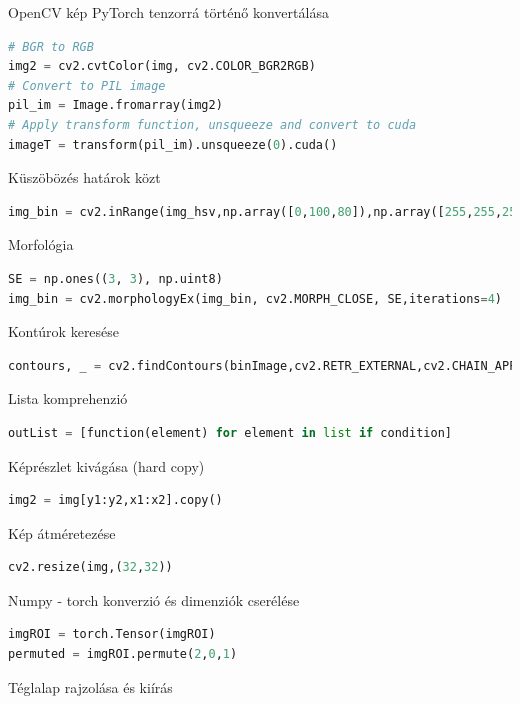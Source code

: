 \documentclass[12pt,a4paper,oneside]{report}             %
\begin{document}
OpenCV kép PyTorch tenzorrá történő konvertálása

\begin{lstlisting}[language=Python]
# BGR to RGB
img2 = cv2.cvtColor(img, cv2.COLOR_BGR2RGB)
# Convert to PIL image
pil_im = Image.fromarray(img2)
# Apply transform function, unsqueeze and convert to cuda
imageT = transform(pil_im).unsqueeze(0).cuda()
\end{lstlisting}

Küszöbözés határok közt

\begin{lstlisting}[language=Python]
img_bin = cv2.inRange(img_hsv,np.array([0,100,80]),np.array([255,255,255]))
\end{lstlisting}

Morfológia

\begin{lstlisting}[language=Python]
SE = np.ones((3, 3), np.uint8)
img_bin = cv2.morphologyEx(img_bin, cv2.MORPH_CLOSE, SE,iterations=4)
\end{lstlisting}

Kontúrok keresése

\begin{lstlisting}[language=Python]
contours, _ = cv2.findContours(binImage,cv2.RETR_EXTERNAL,cv2.CHAIN_APPROX_SIMPLE)
\end{lstlisting}

Lista komprehenzió

\begin{lstlisting}[language=Python]
outList = [function(element) for element in list if condition]
\end{lstlisting}

Képrészlet kivágása (hard copy)

\begin{lstlisting}[language=Python]
img2 = img[y1:y2,x1:x2].copy()
\end{lstlisting}

Kép átméretezése

\begin{lstlisting}[language=Python]
cv2.resize(img,(32,32))
\end{lstlisting}

Numpy - torch konverzió és dimenziók cserélése

\begin{lstlisting}[language=Python]
imgROI = torch.Tensor(imgROI)
permuted = imgROI.permute(2,0,1)
\end{lstlisting}

Téglalap rajzolása és kiírás
\end{document}
